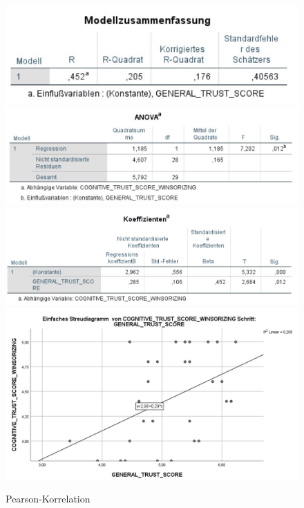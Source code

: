 \documentclass[a4paper,11pt]{article}%
\renewcommand{\\}{\vspace*{0.5\baselineskip} \newline}
\begin{document}
\begin{figure}[H]
\centering
		\begin{footnotesize}
			\includegraphics[scale=0.8]{Abbildungen/Post_QuestionnaireStatistiks/regression_gt_ct_modell}\\
			\includegraphics[scale=0.8]{Abbildungen/Post_QuestionnaireStatistiks/regression_gt_ct_anova}\\
			\includegraphics[scale=0.8]{Abbildungen/Post_QuestionnaireStatistiks/regression_gt_ct_koeffizienten}\\
			\includegraphics[scale=0.5]{Abbildungen/Post_QuestionnaireStatistiks/diagramm_regression_gt_ct}\\
			\caption{Pearson-Korrelation}
			\label{fig:regressionsanalyse}
		\end{footnotesize}
	\end{figure}	
\end{document}
